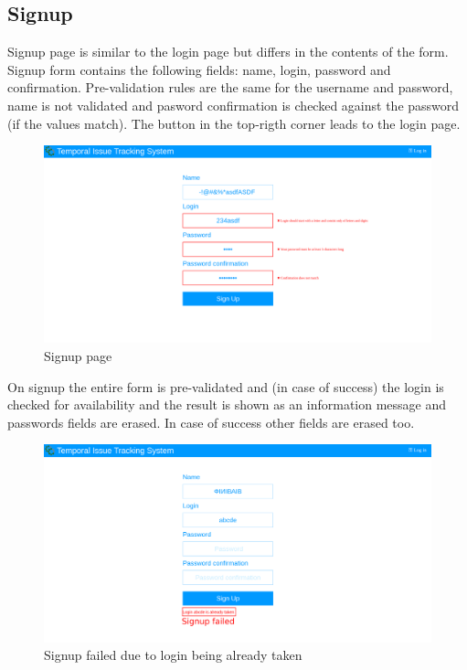 \documentclass{article}
\begin{document}
\subsection{Signup}
Signup page is similar to the login page but differs in the contents of the form. Signup form contains the following fields: name, login, password and confirmation. Pre-validation rules are the same for the username and password, name is not validated and pasword confirmation is checked against the password (if the values match). The button in the top-rigth corner leads to the login page.
\begin{figure}[H]
    \includegraphics[width=\textwidth]{img/signup.png}
    \caption{Signup page}
\end{figure}
On signup the entire form is pre-validated and (in case of success) the login is checked for availability and the result is shown as an information message and passwords fields are erased. In case of success other fields are erased too.
\begin{figure}[H]
    \includegraphics[width=\textwidth]{img/signupfailed.png}
    \caption{Signup failed due to login being already taken}
\end{figure}
\end{document}
